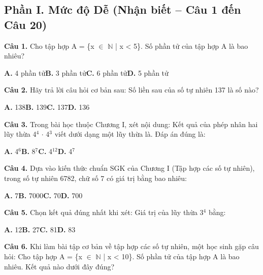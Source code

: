 \documentclass[11pt,a4paper]{article}
\begin{document}
\subsection*{\color{accent} Phần I. Mức độ Dễ (Nhận biết -- Câu 1 đến Câu 20)}
\textbf{\color{primary} Câu 1.} Cho tập hợp A = \{x $\in$ $\mathbb{N}$ | x < 5\}. Số phần tử của tập hợp A là bao nhiêu?\par
\hspace*{1.5em}\textbf{A.} 4 phần tử\quad\quad \textbf{B.} 3 phần tử\quad\quad \textbf{C.} 6 phần tử\quad\quad \textbf{D.} 5 phần tử\par\vspace{2pt}
\textbf{\color{primary} Câu 2.} Hãy trả lời câu hỏi cơ bản sau: Số liền sau của số tự nhiên 137 là số nào?\par
\hspace*{1.5em}\textbf{A.} 138\quad\quad \textbf{B.} 139\quad\quad \textbf{C.} 137\quad\quad \textbf{D.} 136\par\vspace{2pt}
\textbf{\color{primary} Câu 3.} Trong bài học thuộc Chương I, xét nội dung: Kết quả của phép nhân hai lũy thừa 4$^{4}$ $\cdot$ 4$^{3}$ viết dưới dạng một lũy thừa là. Đáp án đúng là:\par
\hspace*{1.5em}\textbf{A.} 4$^{6}$\quad\quad \textbf{B.} 8$^{7}$\quad\quad \textbf{C.} 4$^{12}$\quad\quad \textbf{D.} 4$^{7}$\par\vspace{2pt}
\textbf{\color{primary} Câu 4.} Dựa vào kiến thức chuẩn SGK của Chương I (Tập hợp các số tự nhiên), trong số tự nhiên 6782, chữ số 7 có giá trị bằng bao nhiêu:\par
\hspace*{1.5em}\textbf{A.} 7\quad\quad \textbf{B.} 7000\quad\quad \textbf{C.} 70\quad\quad \textbf{D.} 700\par\vspace{2pt}
\textbf{\color{primary} Câu 5.} Chọn kết quả đúng nhất khi xét: Giá trị của lũy thừa 3$^{4}$ bằng:\par
\hspace*{1.5em}\textbf{A.} 12\quad\quad \textbf{B.} 27\quad\quad \textbf{C.} 81\quad\quad \textbf{D.} 83\par\vspace{2pt}
\textbf{\color{primary} Câu 6.} Khi làm bài tập cơ bản về tập hợp các số tự nhiên, một học sinh gặp câu hỏi: Cho tập hợp A = \{x $\in$ $\mathbb{N}$ | x < 10\}. Số phần tử của tập hợp A là bao nhiêu. Kết quả nào dưới đây đúng?\par
\end{document}
